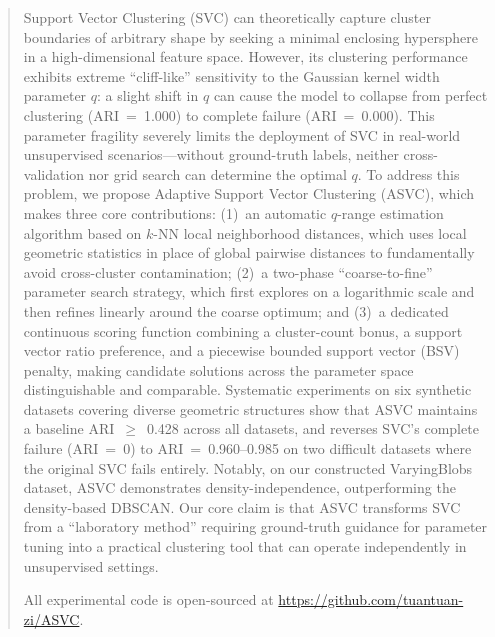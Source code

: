 \begin{abstract}
Support Vector Clustering (SVC) can theoretically capture cluster boundaries of arbitrary shape by seeking a minimal enclosing hypersphere in a high-dimensional feature space. However, its clustering performance exhibits extreme ``cliff-like'' sensitivity to the Gaussian kernel width parameter $q$: a slight shift in $q$ can cause the model to collapse from perfect clustering (ARI~=~1.000) to complete failure (ARI~=~0.000). This parameter fragility severely limits the deployment of SVC in real-world unsupervised scenarios---without ground-truth labels, neither cross-validation nor grid search can determine the optimal $q$. To address this problem, we propose Adaptive Support Vector Clustering (ASVC), which makes three core contributions: (1)~an automatic $q$-range estimation algorithm based on $k$-NN local neighborhood distances, which uses local geometric statistics in place of global pairwise distances to fundamentally avoid cross-cluster contamination; (2)~a two-phase ``coarse-to-fine'' parameter search strategy, which first explores on a logarithmic scale and then refines linearly around the coarse optimum; and (3)~a dedicated continuous scoring function combining a cluster-count bonus, a support vector ratio preference, and a piecewise bounded support vector (BSV) penalty, making candidate solutions across the parameter space distinguishable and comparable. Systematic experiments on six synthetic datasets covering diverse geometric structures show that ASVC maintains a baseline ARI~$\geq$~0.428 across all datasets, and reverses SVC's complete failure (ARI~=~0) to ARI~=~0.960--0.985 on two difficult datasets where the original SVC fails entirely. Notably, on our constructed VaryingBlobs dataset, ASVC demonstrates density-independence, outperforming the density-based DBSCAN. Our core claim is that ASVC transforms SVC from a ``laboratory method'' requiring ground-truth guidance for parameter tuning into a practical clustering tool that can operate independently in unsupervised settings.

All experimental code is open-sourced at \url{https://github.com/tuantuan-zi/ASVC}.
\end{abstract}
